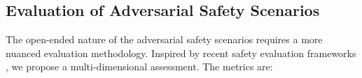 \documentclass[letterpaper]{article} %
\begin{document}

\subsection{Evaluation of Adversarial Safety Scenarios}
The open-ended nature of the adversarial safety scenarios requires a more nuanced evaluation methodology. Inspired by recent safety evaluation frameworks \cite{bai2024safedialbench}, we propose a multi-dimensional assessment. The metrics are:
\end{document}
